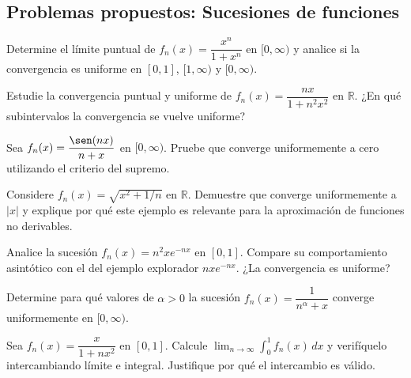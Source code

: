 \subsection{Problemas propuestos: Sucesiones de funciones}



\begin{prob} Determine el límite puntual de
          $f_n(x) = \dfrac{x^n}{1+x^n}$ en $[0, \infty)$ y analice
          si la convergencia es uniforme en $[0,1]$, $[1,\infty)$ y
          $[0,\infty)$.
\end{prob}

\begin{prob}
Estudie la convergencia puntual y uniforme de
          $f_n(x) = \dfrac{nx}{1+n^2x^2}$ en $\mathbb{R}$.
          ¿En qué subintervalos la convergencia se vuelve uniforme?
\end{prob}

\begin{prob}Sea $f_n(x) = \dfrac{\sen(nx)}{n+x}$ en $[0, \infty)$.
          Pruebe que converge uniformemente a cero utilizando el
          criterio del supremo.
\end{prob}


\begin{prob}Considere $f_n(x) = \sqrt{x^2 + 1/n}$ en $\mathbb{R}$.
          Demuestre que converge uniformemente a $|x|$ y explique por
          qué este ejemplo es relevante para la aproximación de
          funciones no derivables.
\end{prob}

\begin{prob}Analice la sucesión $f_n(x) = n^2 x e^{-nx}$ en $[0,1]$.
          Compare su comportamiento asintótico con el del ejemplo
          explorador $nxe^{-nx}$. ¿La convergencia es uniforme?
\end{prob}

\begin{prob} Determine para qué valores de $\alpha > 0$ la sucesión
          $f_n(x) = \dfrac{1}{n^\alpha + x}$ converge uniformemente
          en $[0, \infty)$.
\end{prob}

\begin{prob} Sea $f_n(x) = \dfrac{x}{1+nx^2}$ en $[0,1]$. Calcule
          $\lim_{n\to\infty} \int_0^1 f_n(x)\,dx$ y verifíquelo
          intercambiando límite e integral. Justifique por qué el
          intercambio es válido.
\end{prob}

